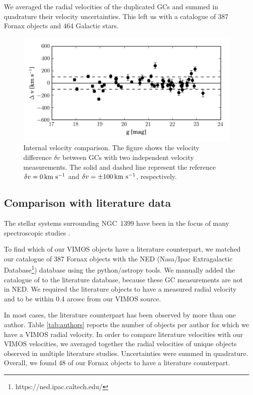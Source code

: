 \documentclass[useAMS,usenatbib]{mn2e}
\newcommand{\kms}{\mbox{\,km~s$^{-1}$}}
\begin{document}
We averaged the radial velocities of the duplicated GCs and summed in 
quadrature their velocity uncertainties. This left us with a catalogue of 387 
Fornax objects and 464 Galactic stars.

\begin{figure}
\centering
\includegraphics[width=\columnwidth]{figures/internal.png} 
\caption{Internal velocity comparison. The figure shows the velocity difference 
$\delta v$ between GCs with two independent velocity measurements. The solid 
and dashed line represent the reference $\delta v = 0 \kms$ and 
$\delta v = \pm 100 \kms$, respectively. }
\label{fig:internal}
\end{figure}

\subsection{Comparison with literature data}\label{sec:compar}

The stellar systems surrounding NGC~1399 have been in the focus of many 
spectroscopic studies
\citep{Dirsch04, Schuberth, Bergond07, Firth07, Chilingarian11, Mieske04, 
Hilker07, Francis12, Drinkwater00}.

To find which of our VIMOS objects have a literature counterpart, we matched 
our catalogue of 387 Fornax objects with the NED (Nasa/Ipac Extragalactic 
Database\footnote{https://ned.ipac.caltech.edu/}) database using the 
python/astropy tools. 
We manually added the catalogue of \citet{Schuberth} to the literature 
database, because these GC measurements are not in NED. We required the 
literature objects to have a measured radial velocity and to be within 0.4 
arcsec from our VIMOS source. 

In most cases, the literature counterpart has been observed by more than one 
author. Table \ref{tab:authors} reports the number of objects per author for 
which we have a VIMOS radial velocity. 
In order to compare literature velocities with our VIMOS velocities, we 
averaged together the radial velocities of unique objects observed in multiple 
literature studies. Uncertainties were summed in quadrature. 
Overall, we found 48 of our Fornax objects to have a literature counterpart. 
\end{document}

